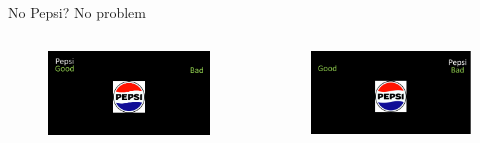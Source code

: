 \documentclass[compress]{beamer}
\begin{document}
\begin{frame}{No Pepsi? No problem}
		\begin{columns}
		\centering{\textcolor{unipd}{Pepsi-Good}}
		\begin{figure}
			\includegraphics[width=\linewidth]{scPgood.png}
		\end{figure}
		
		\centering{\textcolor{blu}{Pepsi-Bad}}
		\begin{figure}
			\includegraphics[width=\linewidth]{scPbad.png}
		\end{figure}
	\end{columns}
\end{frame}
\end{document}
